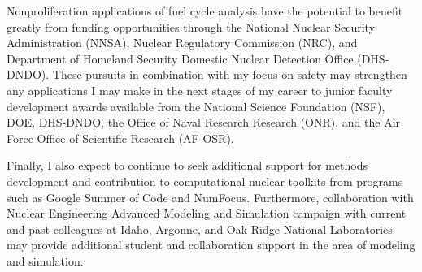 \documentclass[a4paper, 12pt]{article}
\begin{document}
Nonproliferation applications of fuel cycle analysis have the potential to 
benefit greatly from funding opportunities through the National Nuclear Security 
Administration (NNSA), Nuclear Regulatory Commission (NRC), and Department of 
Homeland Security Domestic Nuclear Detection Office (DHS-DNDO). These pursuits 
in combination with my focus on safety may strengthen any applications I may 
make in the next stages of my career to junior faculty development awards 
available from the National Science Foundation (NSF), DOE, DHS-DNDO, the Office 
of Naval Research Research (ONR), and the Air Force Office of Scientific 
Research (AF-OSR).

Finally, I also expect to continue to seek additional support for methods development and 
contribution to computational nuclear toolkits from programs such as Google 
Summer of Code and NumFocus. Furthermore, collaboration with Nuclear Engineering Advanced 
Modeling and Simulation campaign with current and past colleagues at Idaho, 
Argonne, and Oak Ridge National Laboratories may provide additional student and 
collaboration support in the area of modeling and simulation. 




\end{document}
